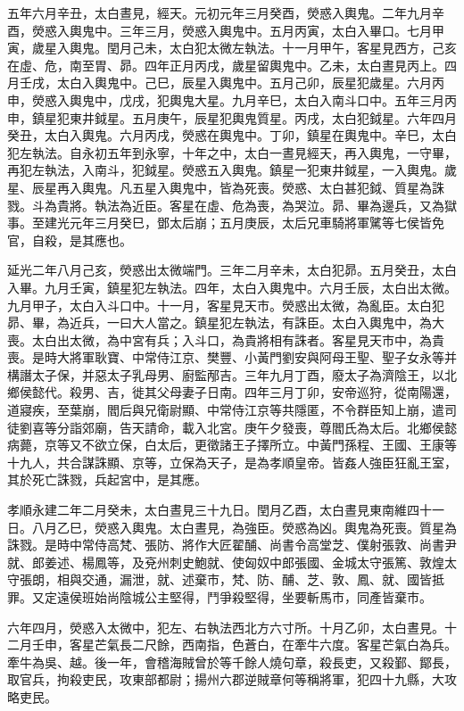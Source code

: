 \begin{pinyinscope}
五年六月辛丑，太白晝見，經天。元初元年三月癸酉，熒惑入輿鬼。二年九月辛酉，熒惑入輿鬼中。三年三月，熒惑入輿鬼中。五月丙寅，太白入畢口。七月甲寅，歲星入輿鬼。閏月己未，太白犯太微左執法。十一月甲午，客星見西方，己亥在虛、危，南至胃、昴。四年正月丙戌，歲星留輿鬼中。乙未，太白晝見丙上。四月壬戌，太白入輿鬼中。己巳，辰星入輿鬼中。五月己卯，辰星犯歲星。六月丙申，熒惑入輿鬼中，戊戌，犯輿鬼大星。九月辛巳，太白入南斗口中。五年三月丙申，鎮星犯東井鉞星。五月庚午，辰星犯輿鬼質星。丙戌，太白犯鉞星。六年四月癸丑，太白入輿鬼。六月丙戌，熒惑在輿鬼中。丁卯，鎮星在輿鬼中。辛巳，太白犯左執法。自永初五年到永寧，十年之中，太白一晝見經天，再入輿鬼，一守畢，再犯左執法，入南斗，犯鉞星。熒惑五入輿鬼。鎮星一犯東井鉞星，一入輿鬼。歲星、辰星再入輿鬼。凡五星入輿鬼中，皆為死喪。熒惑、太白甚犯鉞、質星為誅戮。斗為貴將。執法為近臣。客星在虛、危為喪，為哭泣。昴、畢為邊兵，又為獄事。至建光元年三月癸巳，鄧太后崩；五月庚辰，太后兄車騎將軍騭等七侯皆免官，自殺，是其應也。

延光二年八月己亥，熒惑出太微端門。三年二月辛未，太白犯昴。五月癸丑，太白入畢。九月壬寅，鎮星犯左執法。四年，太白入輿鬼中。六月壬辰，太白出太微。九月甲子，太白入斗口中。十一月，客星見天巿。熒惑出太微，為亂臣。太白犯昴、畢，為近兵，一曰大人當之。鎮星犯左執法，有誅臣。太白入輿鬼中，為大喪。太白出太微，為中宮有兵；入斗口，為貴將相有誅者。客星見天巿中，為貴喪。是時大將軍耿寶、中常侍江京、樊豐、小黃門劉安與阿母王聖、聖子女永等并構譖太子保，并惡太子乳母男、廚監邴吉。三年九月丁酉，廢太子為濟陰王，以北鄉侯懿代。殺男、吉，徙其父母妻子日南。四年三月丁卯，安帝巡狩，從南陽還，道寢疾，至葉崩，閻后與兄衛尉顯、中常侍江京等共隱匿，不令群臣知上崩，遣司徒劉喜等分詣郊廟，告天請命，載入北宮。庚午夕發喪，尊閻氏為太后。北鄉侯懿病薨，京等又不欲立保，白太后，更徵諸王子擇所立。中黃門孫程、王國、王康等十九人，共合謀誅顯、京等，立保為天子，是為孝順皇帝。皆姦人強臣狂亂王室，其於死亡誅戮，兵起宮中，是其應。

孝順永建二年二月癸未，太白晝見三十九日。閏月乙酉，太白晝見東南維四十一日。八月乙巳，熒惑入輿鬼。太白晝見，為強臣。熒惑為凶。輿鬼為死喪。質星為誅戮。是時中常侍高梵、張防、將作大匠翟酺、尚書令高堂芝、僕射張敦、尚書尹就、郎姜述、楊鳳等，及兗州刺史鮑就、使匈奴中郎張國、金城太守張篤、敦煌太守張朗，相與交通，漏泄，就、述棄巿，梵、防、酺、芝、敦、鳳、就、國皆抵罪。又定遠侯班始尚陰城公主堅得，鬥爭殺堅得，坐要斬馬巿，同產皆棄巿。

六年四月，熒惑入太微中，犯左、右執法西北方六寸所。十月乙卯，太白晝見。十二月壬申，客星芒氣長二尺餘，西南指，色蒼白，在牽牛六度。客星芒氣白為兵。牽牛為吳、越。後一年，會稽海賊曾於等千餘人燒句章，殺長吏，又殺鄞、鄮長，取官兵，拘殺吏民，攻東部都尉；揚州六郡逆賊章何等稱將軍，犯四十九縣，大攻略吏民。


\end{pinyinscope}
